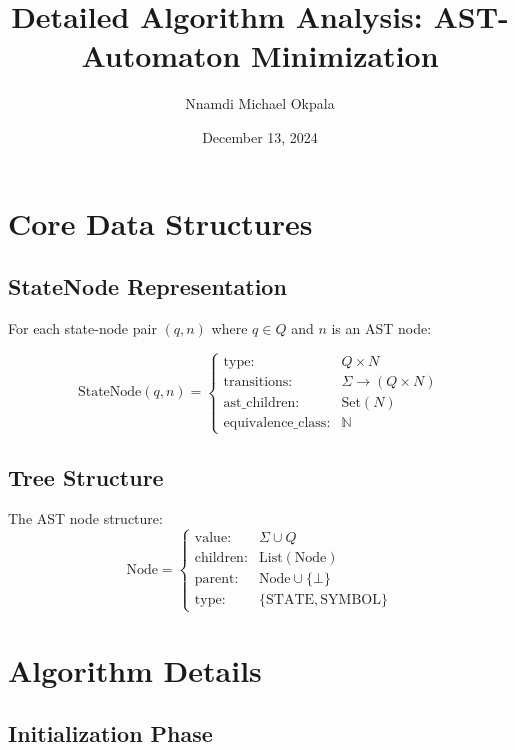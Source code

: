 \documentclass[12pt]{article}
\title{Detailed Algorithm Analysis: AST-Automaton Minimization}
\author{Nnamdi Michael Okpala}
\date{December 13, 2024}
\begin{document}
\maketitle

\section{Core Data Structures}

\subsection{StateNode Representation}
For each state-node pair $(q, n)$ where $q \in Q$ and $n$ is an AST node:

\[
\text{StateNode}(q, n) = \begin{cases}
    \text{type}: & Q \times N \\
    \text{transitions}: & \Sigma \rightarrow (Q \times N) \\
    \text{ast\_children}: & \text{Set}(N) \\
    \text{equivalence\_class}: & \mathbb{N}
\end{cases}
\]

\subsection{Tree Structure}
The AST node structure:
\[
\text{Node} = \begin{cases}
    \text{value}: & \Sigma \cup Q \\
    \text{children}: & \text{List}(\text{Node}) \\
    \text{parent}: & \text{Node} \cup \{\bot\} \\
    \text{type}: & \{\text{STATE}, \text{SYMBOL}\}
\end{cases}
\]

\section{Algorithm Details}

\subsection{Initialization Phase}
\end{document}
